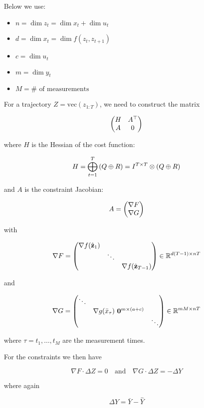 \documentclass{article}
\begin{document}
Below we use:

\begin{itemize}
  \item $n = \dim z_t = \dim x_t + \dim u_t $ 
  \item $d = \dim x_t = \dim f(z_t, z_{t+1}) $ 
  \item $c = \dim u_t$  
  \item $m = \dim y_t$ 
  \item $M = \#\text{ of measurements}$
\end{itemize}



For a trajectory $Z = \text{vec}(z_{1:T})$, we need to construct the matrix

$$
\mqty(
  H & A^\top \\
  A & 0
)
$$


where $H$ is the Hessian of the cost function:

$$
H = \bigoplus_{t=1}^T \qty(Q \oplus R) = I^{T \times T} \otimes \qty(Q \oplus R)
$$


and $A$ is the constraint Jacobian:

$$
A = \mqty(
  \nabla F \\
  \nabla G
)
$$

with 

$$
\nabla F = \mqty(
  \nabla f(\hat{\vb{z}}_1) \\
  & \ddots \\
  & & \nabla f(\hat{\vb{z}}_{T-1})
) \in \mathbb{R}^{d (T - 1) \times n T}
$$

and

$$
\nabla G = \mqty(
  \ddots \\
  & \nabla g(\bar x_{\tau}) \ \vb{0}^{m \times (a + c)} \\
  & & \ddots
) \in \mathbb{R}^{m M \times n T}
$$

where $\tau = t_1, \dots, t_M$ are the measurement times.

\hfill

For the constraints we then have

$$
\nabla F \cdot \Delta Z = 0
\quad \text{and} \quad
\nabla G \cdot \Delta Z = - \Delta Y
$$

where again

$$
\Delta Y = \bar Y - \hat Y
$$
 
\end{document}
